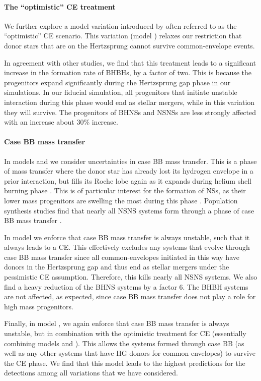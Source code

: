 \paragraph{The ``optimistic'' CE treatment} We further explore a model variation introduced by \citet{Belczynski+2007} often referred to as the ``optimistic'' CE scenario. This variation (model \modOpt{}) relaxes our restriction that donor stars that are on the Hertzsprung cannot survive common-envelope events.

In agreement with other studies, we find that this treatment leads to a significant increase in the formation rate of BHBHs, by a factor of two. This is because the progenitors expand significantly during the Hertzsprung gap phase in our simulations. In our fiducial simulation, all progenitors that initiate unstable interaction during this phase would end as stellar mergers, while in this variation they will survive. The progenitors of BHNSs and NSNSs are less strongly affected with an increase about 30\% increase.

\paragraph{Case BB mass transfer} In models \modCaseBB{} and \modCaseBBOpt{} we consider uncertainties in case BB mass transfer. This is a phase of mass transfer where the donor star has already lost its hydrogen envelope in a prior interaction, but fills its Roche lobe again as it expands during helium shell burning phase \citep[e.g.][]{Dewi+2003, Tauris+2015, Tauris+2017}. This is of particular interest for the formation of NSs, as their lower mass progenitors are swelling the most during this phase \citep[e.g.][and references therein]{Laplace+2020}. Population synthesis studies find that nearly all NSNS systems form through a phase of case BB mass transfer \citep{Vigna-Gomez+2018}.

In model \modCaseBB{} we enforce that case BB mass transfer is always unstable, such that it always leads to a CE. This effectively excludes any systems that evolve through case BB mass transfer since all common-envelopes initiated in this way have donors in the Hertzsprung gap and thus end as stellar mergers under the pessimistic CE assumption. Therefore, this kills nearly all NSNS systems. We also find a heavy reduction of the BHNS systems by a factor 6. The BHBH systems are not affected, as expected, since case BB mass transfer does not play a role for high mass progenitors.

Finally, in model \modCaseBBOpt{}, we again enforce that case BB mass transfer is always unstable, but in combination with the optimistic treatment for CE (essentially combining models \modCaseBB{} and \modOpt{}). This allows the systems formed through case BB (as well as any other systems that have HG donors for common-envelopes) to survive the CE phase. We find that this model leads to the highest predictions for the detections among all variations that we have considered.

